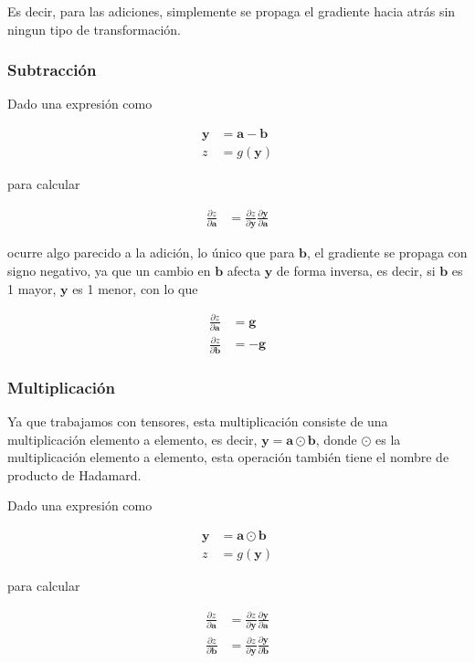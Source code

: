 \documentclass{article}
\begin{document}
Es decir, para las adiciones, simplemente se propaga el gradiente hacia atrás sin ningun tipo de transformación.

\newpage

\subsubsection*{Subtracción}

Dado una expresión como

\begin{align*}
	\bm{y} &= \bm{a} - \bm{b} \\
	z &= g(\bm{y})
\end{align*}

para calcular

\begin{align*}
	\frac{\partial z}{\partial \bm{a}} &= \frac{\partial z}{\partial \bm{y}} \frac{\partial \bm{y}}{\partial \bm{a}}
\end{align*}

ocurre algo parecido a la adición, lo único que para $\bm{b}$, el gradiente se propaga con signo negativo, ya que un cambio en $\bm{b}$ afecta $\bm{y}$ de forma inversa,
es decir, si $\bm{b}$ es 1 mayor, $\bm{y}$ es 1 menor, con lo que

\begin{align*}
	\frac{\partial z}{\partial \bm{a}} &=  \bm{g} \\
	\frac{\partial z}{\partial \bm{b}} &= -\bm{g}
\end{align*}

\subsubsection*{Multiplicación}

Ya que trabajamos con tensores, esta multiplicación consiste de una multiplicación elemento a elemento, es decir,
$\bm{y} = \bm{a} \odot \bm{b}$, donde $\odot$ es la multiplicación elemento a elemento, esta operación también
tiene el nombre de producto de Hadamard.

Dado una expresión como

\begin{align*}
	\bm{y} &= \bm{a} \odot \bm{b} \\
	z &= g(\bm{y})
\end{align*}

para calcular

\begin{align*}
	\frac{\partial z}{\partial \bm{a}} &= \frac{\partial z}{\partial \bm{y}} \frac{\partial \bm{y}}{\partial \bm{a}} \\
	\frac{\partial z}{\partial \bm{b}} &= \frac{\partial z}{\partial \bm{y}} \frac{\partial \bm{y}}{\partial \bm{b}}
\end{align*}
\end{document}
